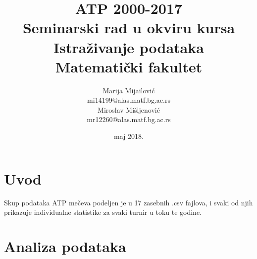 \documentclass[a4paper]{article}
\begin{document}
\title{ATP 2000-2017\\ \small{Seminarski rad u okviru kursa\\Istraživanje podataka\\ Matematički fakultet}}

\author{Marija Mijailović\\ mi14199@alas.matf.bg.ac.rs\\Miroslav Mišljenović\\mr12260@alas.matf.bg.ac.rs}
\date{maj 2018.}
\maketitle




\section{Uvod}
\label{sec:uvod}

Skup podataka ATP mečeva podeljen je u 17 zasebnih .csv fajlova, i svaki od njih prikazuje individualne statistike za svaki turnir u toku te godine.


\section{Analiza podataka}
\end{document}
